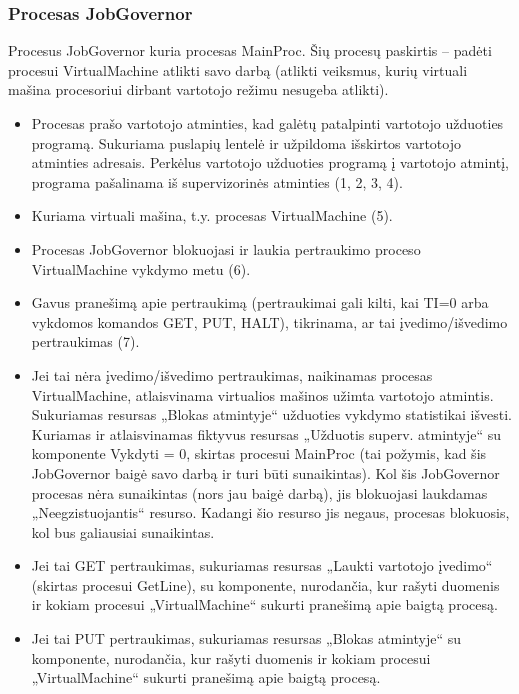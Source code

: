 \subsubsection{Procesas JobGovernor}
Procesus JobGovernor kuria procesas MainProc. Šių procesų paskirtis – padėti procesui VirtualMachine atlikti savo darbą (atlikti veiksmus, kurių virtuali mašina procesoriui dirbant vartotojo režimu nesugeba atlikti).
	\begin{itemize}
		\item Procesas prašo vartotojo atminties, kad galėtų patalpinti vartotojo užduoties programą. Sukuriama puslapių lentelė ir užpildoma išskirtos vartotojo atminties adresais. Perkėlus vartotojo užduoties programą į vartotojo atmintį, programa pašalinama iš supervizorinės atminties (1, 2, 3, 4). 
		\item Kuriama virtuali mašina, t.y. procesas VirtualMachine (5).
		\item Procesas JobGovernor blokuojasi ir laukia pertraukimo proceso VirtualMachine vykdymo metu (6).
		\item Gavus pranešimą apie pertraukimą (pertraukimai gali kilti, kai TI=0 arba vykdomos komandos GET, PUT, HALT), tikrinama, ar tai įvedimo/išvedimo pertraukimas (7).
		\item Jei tai nėra įvedimo/išvedimo pertraukimas, naikinamas procesas VirtualMachine, atlaisvinama virtualios mašinos užimta vartotojo atmintis. Sukuriamas resursas „Blokas atmintyje“ užduoties vykdymo statistikai išvesti. Kuriamas ir atlaisvinamas fiktyvus resursas „Užduotis superv. atmintyje“ su komponente Vykdyti = 0, skirtas procesui MainProc (tai požymis, kad šis JobGovernor baigė savo darbą ir turi būti sunaikintas). Kol šis JobGovernor procesas nėra sunaikintas (nors jau baigė darbą), jis blokuojasi laukdamas „Neegzistuojantis“ resurso. Kadangi šio resurso jis negaus, procesas blokuosis, kol bus galiausiai sunaikintas.
		\item Jei tai GET pertraukimas, sukuriamas resursas „Laukti vartotojo įvedimo“ (skirtas procesui GetLine), su komponente, nurodančia, kur rašyti duomenis ir kokiam procesui „VirtualMachine“ sukurti pranešimą apie baigtą procesą.
		\item Jei tai PUT pertraukimas, sukuriamas resursas „Blokas atmintyje“ su komponente, nurodančia, kur rašyti duomenis ir kokiam procesui „VirtualMachine“ sukurti pranešimą apie baigtą procesą.
	\end{itemize}
